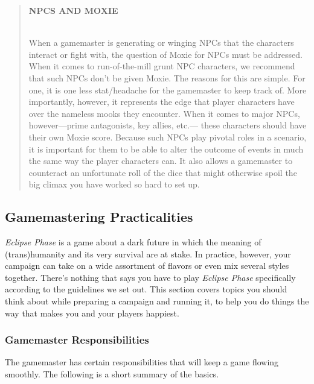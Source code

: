 \begin{quotation}
\begin{large}
\textbf{NPCS AND MOXIE}
\end{large}
\\
When a gamemaster is generating or winging
NPCs that the characters interact or fight
with, the question of Moxie for NPCs must be
addressed. When it comes to run-of-the-mill
grunt NPC characters, we recommend that such
NPCs don’t be given Moxie. The reasons for this
are simple. For one, it is one less stat/headache
for the gamemaster to keep track of. More importantly,
however, it represents the edge that
player characters have over the nameless mooks
they encounter. When it comes to major NPCs,
however—prime antagonists, key allies, etc.—
these characters should have their own Moxie
score. Because such NPCs play pivotal roles in a
scenario, it is important for them to be able to
alter the outcome of events in much the same
way the player characters can. It also allows a
gamemaster to counteract an unfortunate roll
of the dice that might otherwise spoil the big
climax you have worked so hard to set up.
\end{quotation}

\subsection{Gamemastering Practicalities}

\textit{Eclipse Phase} is a game about a dark future in which 
the meaning of (trans)humanity and its very survival 
are at stake. In practice, however, your campaign can 
take on a wide assortment of flavors or even mix 
several styles together. There's nothing that says you 
have to play \textit{Eclipse Phase} specifically according to 
the guidelines we set out. This section covers topics 
you should think about while preparing a campaign 
and running it, to help you do things the way that 
makes you and your players happiest.

\subsubsection{Gamemaster Responsibilities }

The gamemaster has certain responsibilities that will 
keep a game flowing smoothly. The following is a 
short summary of the basics.

